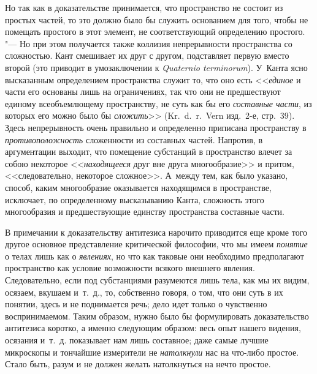 Но так как в доказательстве принимается, что пространство не состоит из
простых частей, то это должно было бы служить основанием для того, чтобы не
помещать простого в этот элемент, не соответствующий определению простого.
"--- Но при этом получается также коллизия непрерывности пространства со
сложностью. Кант смешивает их друг с другом, подставляет первую вместо
второй (это приводит в умозаключении к {\em Quaternio
terminorum}). У~Канта ясно высказанным определением пространства служит то,
что оно есть <<{\em единое} и части его основаны лишь на
ограничениях, так что они не предшествуют единому всеобъемлющему
пространству, не суть как бы его {\em составные части},
из которых его можно было бы {\em сложить}>> (Kr.~d.~r.~Vern
изд.~2-е, стр.~39). Здесь непрерывность очень правильно и определенно
приписана пространству в {\em противоположность}
сложенности из составных частей. Напротив, в аргументации выходит, что
помещение субстанций в пространство влечет за собою некоторое
<<{\em находящееся} друг вне друга многообразие>> и
притом, <<следовательно, некоторое сложное>>. А~между тем, как было указано,
способ, каким многообразие оказывается находящимся в пространстве,
исключает, по определенному высказыванию Канта, сложность этого
многообразия и предшествующие единству пространства составные части.

В примечании к доказательству антитезиса нарочито приводится еще кроме того
другое основное представление критической философии, что мы имеем
{\em понятие} о телах лишь как о
{\em явлениях}, но что как таковые они необходимо
предполагают пространство как условие возможности всякого внешнего явления.
Следовательно, если под субстанциями разумеются лишь тела, как мы их видим,
осязаем, вкушаем и~т.~д., то, собственно говоря, о том, что они суть в их
понятии, здесь и не поднимается речь; дело идет только о чувственно
воспринимаемом. Таким образом, нужно было бы формулировать доказательство
антитезиса коротко, а именно следующим образом: весь опыт нашего видения,
осязания и~т.~д. показывает нам лишь составное; даже самые лучшие
микроскопы и тончайшие измерители не {\em натолкнули}
нас на что-либо простое. Стало быть, разум и не должен желать натолкнуться
на нечто простое.

